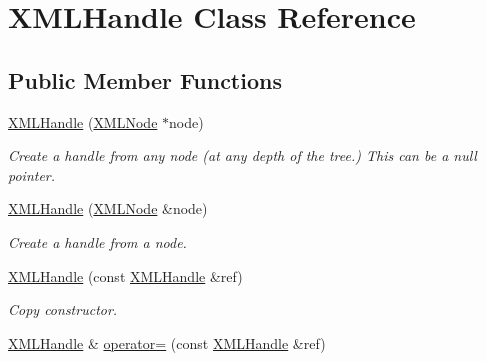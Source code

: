 \hypertarget{classtinyxml2_1_1_x_m_l_handle}{\section{X\-M\-L\-Handle Class Reference}
\label{classtinyxml2_1_1_x_m_l_handle}
}
\subsection*{Public Member Functions}
\begin{DoxyCompactItemize}
\item 
\hypertarget{classtinyxml2_1_1_x_m_l_handle_a6a13b163ae2438ba63b2454912c54f23}{\hyperlink{classtinyxml2_1_1_x_m_l_handle_a6a13b163ae2438ba63b2454912c54f23}{X\-M\-L\-Handle} (\hyperlink{classtinyxml2_1_1_x_m_l_node}{X\-M\-L\-Node} $\ast$node)}\label{classtinyxml2_1_1_x_m_l_handle_a6a13b163ae2438ba63b2454912c54f23}

\begin{DoxyCompactList}\small\item\em Create a handle from any node (at any depth of the tree.) This can be a null pointer. \end{DoxyCompactList}\item 
\hypertarget{classtinyxml2_1_1_x_m_l_handle_ad0b27b856618cf85dc3ed1605a7ee60e}{\hyperlink{classtinyxml2_1_1_x_m_l_handle_ad0b27b856618cf85dc3ed1605a7ee60e}{X\-M\-L\-Handle} (\hyperlink{classtinyxml2_1_1_x_m_l_node}{X\-M\-L\-Node} \&node)}\label{classtinyxml2_1_1_x_m_l_handle_ad0b27b856618cf85dc3ed1605a7ee60e}

\begin{DoxyCompactList}\small\item\em Create a handle from a node. \end{DoxyCompactList}\item 
\hypertarget{classtinyxml2_1_1_x_m_l_handle_a81b53dd8e6f39f9859bbc13e51bb30d1}{\hyperlink{classtinyxml2_1_1_x_m_l_handle_a81b53dd8e6f39f9859bbc13e51bb30d1}{X\-M\-L\-Handle} (const \hyperlink{classtinyxml2_1_1_x_m_l_handle}{X\-M\-L\-Handle} \&ref)}\label{classtinyxml2_1_1_x_m_l_handle_a81b53dd8e6f39f9859bbc13e51bb30d1}

\begin{DoxyCompactList}\small\item\em Copy constructor. \end{DoxyCompactList}\item 
\hypertarget{classtinyxml2_1_1_x_m_l_handle_a3aea48bc9dd333420c06582892f7ab56}{\hyperlink{classtinyxml2_1_1_x_m_l_handle}{X\-M\-L\-Handle} \& \hyperlink{classtinyxml2_1_1_x_m_l_handle_a3aea48bc9dd333420c06582892f7ab56}{operator=} (const \hyperlink{classtinyxml2_1_1_x_m_l_handle}{X\-M\-L\-Handle} \&ref)}\label{classtinyxml2_1_1_x_m_l_handle_a3aea48bc9dd333420c06582892f7ab56}


\end{DoxyCompactItemize}
